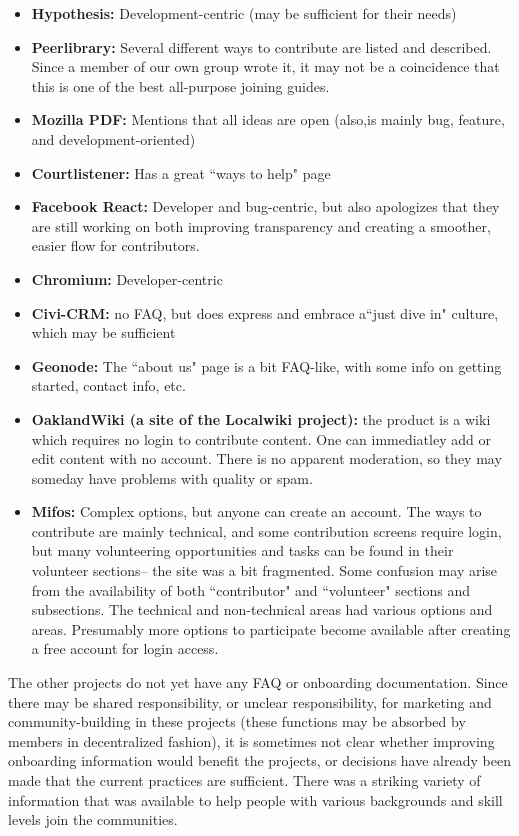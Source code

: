 \begin{itemize}
\item {\bf Hypothesis:} Development-centric (may be sufficient for their needs)
\item {\bf Peerlibrary:} Several different ways to contribute are listed and described. Since a member of our own group wrote it, it may not be a coincidence that this is one of the best all-purpose joining guides.
\item {\bf Mozilla PDF:} Mentions that all ideas are open (also,is mainly bug, feature, and development-oriented)
\item {\bf Courtlistener:} Has a great ``ways to help" page
\item {\bf Facebook React:} Developer and bug-centric, but also apologizes that they are still working on both improving transparency and creating a smoother, easier flow for contributors.
\item {\bf Chromium:} Developer-centric
\item {\bf Civi-CRM:} no FAQ, but does express and embrace a``just dive in" culture, which may be sufficient
\item {\bf Geonode:} The ``about us" page is a bit FAQ-like, with some info on getting started, contact info, etc.
\item {\bf OaklandWiki (a site of the Localwiki project):} the product is a wiki which requires no login to contribute content. One can immediatley add or edit content with no account. There is no apparent moderation, so they may someday have problems with quality or spam.
\item {\bf Mifos: } Complex options, but anyone can create an account. The ways to contribute are mainly technical, and some contribution screens require login, but many volunteering opportunities and tasks can be found in their volunteer sections-- the site was a bit fragmented. Some confusion may arise from the availability of both ``contributor" and ``volunteer" sections and subsections. The technical and non-technical areas had various options and areas. Presumably more options to participate become available after creating a free account for login access.
\end{itemize}

\noindent The other projects do not yet have any FAQ or onboarding documentation. Since there may be shared responsibility, or unclear responsibility, for marketing and community-building in these projects (these functions may be absorbed by members in decentralized fashion), it is sometimes not clear whether improving onboarding information would benefit the projects, or decisions have already been made that the current practices are sufficient. There was a striking variety of information that was available to help people with various backgrounds and skill levels join the communities. 




